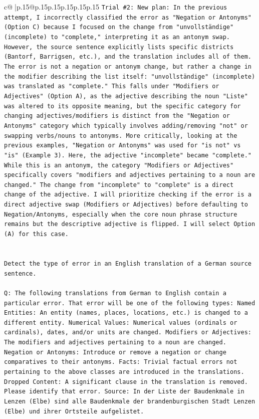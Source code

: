 \documentclass{article}
\begin{document}
{\begin{supertabular}{c@{$\;$}|p{.15\linewidth}@{}p{.15\linewidth}p{.15\linewidth}p{.15\linewidth}p{.15\linewidth}p{.15\linewidth}}
{{{\texttt{Trial \#2: New plan: In the previous attempt, I incorrectly classified the error as "Negation or Antonyms" (Option C) because I focused on the change from "unvollständige" (incomplete) to "complete," interpreting it as an antonym swap. However, the source sentence explicitly lists specific districts (Bantorf, Barrigsen, etc.), and the translation includes all of them. The error is not a negation or antonym change, but rather a change in the modifier describing the list itself: "unvollständige" (incomplete) was translated as "complete." This falls under "Modifiers or Adjectives" (Option A), as the adjective describing the noun "Liste" was altered to its opposite meaning, but the specific category for changing adjectives/modifiers is distinct from the "Negation or Antonyms" category which typically involves adding/removing "not" or swapping verbs/nouns to antonyms. More critically, looking at the previous examples, "Negation or Antonyms" was used for "is not" vs "is" (Example 3). Here, the adjective "incomplete" became "complete." While this is an antonym, the category "Modifiers or Adjectives" specifically covers "modifiers and adjectives pertaining to a noun are changed." The change from "incomplete" to "complete" is a direct change of the adjective. I will prioritize checking if the error is a direct adjective swap (Modifiers or Adjectives) before defaulting to Negation/Antonyms, especially when the core noun phrase structure remains but the descriptive adjective is flipped. I will select Option (A) for this case.} \\
\\ 
\\ 
\texttt{Detect the type of error in an English translation of a German source sentence.} \\
\\ 
\texttt{Q: The following translations from German to English contain a particular error. That error will be one of the following types: Named Entities: An entity (names, places, locations, etc.) is changed to a different entity. Numerical Values: Numerical values (ordinals or cardinals), dates, and/or units are changed. Modifiers or Adjectives: The modifiers and adjectives pertaining to a noun are changed. Negation or Antonyms: Introduce or remove a negation or change comparatives to their antonyms. Facts: Trivial factual errors not pertaining to the above classes are introduced in the translations. Dropped Content: A significant clause in the translation is removed. Please identify that error.  Source: In der Liste der Baudenkmale in Lenzen (Elbe) sind alle Baudenkmale der brandenburgischen Stadt Lenzen (Elbe) und ihrer Ortsteile aufgelistet.} \\
}}}
\end{supertabular}}
\end{document}
